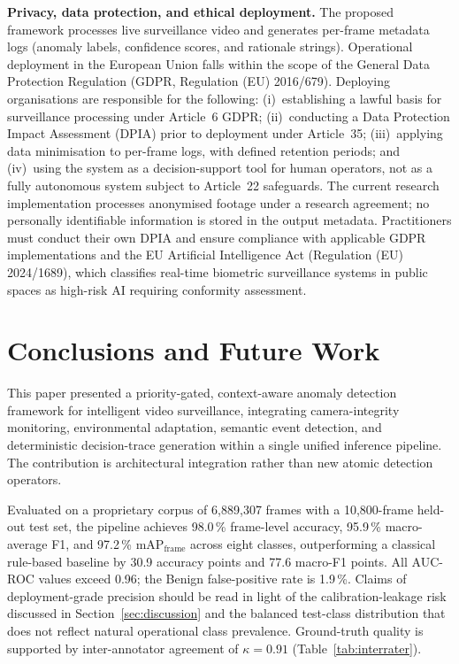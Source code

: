 \documentclass[a4paper,fleqn]{cas-dc}
\begin{document}
\textbf{Privacy, data protection, and ethical deployment.}
The proposed framework processes live surveillance video and generates per-frame metadata logs (anomaly labels, confidence scores, and rationale strings). Operational deployment in the European Union falls within the scope of the General Data Protection Regulation (GDPR, Regulation (EU) 2016/679). Deploying organisations are responsible for the following: (i)~establishing a lawful basis for surveillance processing under Article~6 GDPR; (ii)~conducting a Data Protection Impact Assessment (DPIA) prior to deployment under Article~35; (iii)~applying data minimisation to per-frame logs, with defined retention periods; and (iv)~using the system as a decision-support tool for human operators, not as a fully autonomous system subject to Article~22 safeguards. The current research implementation processes anonymised footage under a research agreement; no personally identifiable information is stored in the output metadata. Practitioners must conduct their own DPIA and ensure compliance with applicable GDPR implementations and the EU Artificial Intelligence Act (Regulation (EU) 2024/1689), which classifies real-time biometric surveillance systems in public spaces as high-risk AI requiring conformity assessment.

\FloatBarrier
\section{Conclusions and Future Work}
\label{sec:conclusion}
 
This paper presented a priority-gated, context-aware anomaly detection framework for intelligent video surveillance, integrating camera-integrity monitoring, environmental adaptation, semantic event detection, and deterministic decision-trace generation within a single unified inference pipeline. The contribution is architectural integration rather than new atomic detection operators.
 
Evaluated on a proprietary corpus of 6{,}889{,}307 frames with a 10{,}800-frame held-out test set, the pipeline achieves 98.0\,\% frame-level accuracy, 95.9\,\% macro-average F1, and 97.2\,\% $\mathrm{mAP}_{\mathrm{frame}}$ across eight classes, outperforming a classical rule-based baseline by 30.9 accuracy points and 77.6 macro-F1 points. All AUC-ROC values exceed 0.96; the Benign false-positive rate is 1.9\,\%. Claims of deployment-grade precision should be read in light of the calibration-leakage risk discussed in Section~\ref{sec:discussion} and the balanced test-class distribution that does not reflect natural operational class prevalence. Ground-truth quality is supported by inter-annotator agreement of $\kappa = 0.91$ (Table~\ref{tab:interrater}).
 
\end{document}
